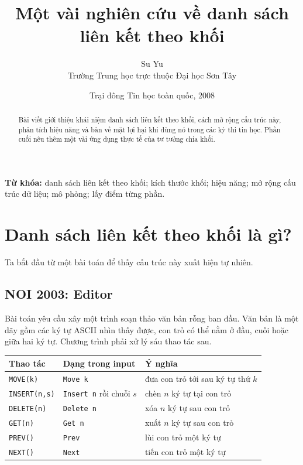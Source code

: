 \documentclass[11pt]{article}
\title{Một vài nghiên cứu về danh sách liên kết theo khối}
\author{Su Yu\\Trường Trung học trực thuộc Đại học Sơn Tây}
\date{Trại đông Tin học toàn quốc, 2008}
\begin{document}
\maketitle


\renewcommand{\abstractname}{Tóm tắt}
\begin{abstract}
Bài viết giới thiệu khái niệm danh sách liên kết theo khối, cách mở rộng cấu
trúc này, phân tích hiệu năng và bàn về mặt lợi hại khi dùng nó trong các kỳ
thi tin học. Phần cuối nêu thêm một vài ứng dụng thực tế của tư tưởng chia
khối.
\end{abstract}

\noindent\textbf{Từ khóa:} danh sách liên kết theo khối; kích thước khối;
hiệu năng; mở rộng cấu trúc dữ liệu; mô phỏng; lấy điểm từng phần.

\section{Danh sách liên kết theo khối là gì?}

Ta bắt đầu từ một bài toán để thấy cấu trúc này xuất hiện tự nhiên.

\subsection{NOI 2003: Editor}

Bài toán yêu cầu xây một trình soạn thảo văn bản rỗng ban đầu. Văn bản là một
dãy gồm các ký tự ASCII nhìn thấy được, con trỏ có thể nằm ở đầu, cuối hoặc
giữa hai ký tự. Chương trình phải xử lý sáu thao tác sau.

\begin{center}
\begin{tabular}{lll}
\textbf{Thao tác} & \textbf{Dạng trong input} & \textbf{Ý nghĩa}\\
\hline
\texttt{MOVE(k)} & \texttt{Move k} & đưa con trỏ tới sau ký tự thứ \(k\)\\
\texttt{INSERT(n,s)} & \texttt{Insert n} rồi chuỗi \(s\) & chèn \(n\) ký tự tại con trỏ\\
\texttt{DELETE(n)} & \texttt{Delete n} & xóa \(n\) ký tự sau con trỏ\\
\texttt{GET(n)} & \texttt{Get n} & xuất \(n\) ký tự sau con trỏ\\
\texttt{PREV()} & \texttt{Prev} & lùi con trỏ một ký tự\\
\texttt{NEXT()} & \texttt{Next} & tiến con trỏ một ký tự
\end{tabular}
\end{center}
\end{document}
